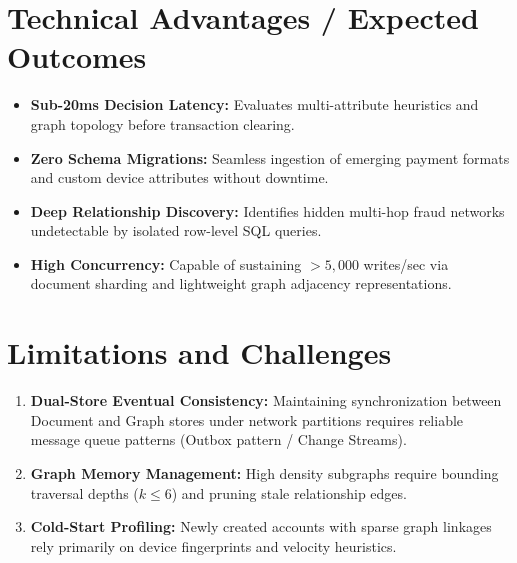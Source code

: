 \documentclass[11pt,a4paper]{article}
\begin{document}
\section{Technical Advantages / Expected Outcomes}
\begin{itemize}[leftmargin=1.5em]
    \item \textbf{Sub-20ms Decision Latency:} Evaluates multi-attribute heuristics and graph topology before transaction clearing.
    \item \textbf{Zero Schema Migrations:} Seamless ingestion of emerging payment formats and custom device attributes without downtime.
    \item \textbf{Deep Relationship Discovery:} Identifies hidden multi-hop fraud networks undetectable by isolated row-level SQL queries.
    \item \textbf{High Concurrency:} Capable of sustaining $>5,000$ writes/sec via document sharding and lightweight graph adjacency representations.
\end{itemize}

\section{Limitations and Challenges}
\begin{enumerate}[leftmargin=1.5em]
    \item \textbf{Dual-Store Eventual Consistency:} Maintaining synchronization between Document and Graph stores under network partitions requires reliable message queue patterns (Outbox pattern / Change Streams).
    \item \textbf{Graph Memory Management:} High density subgraphs require bounding traversal depths ($k \le 6$) and pruning stale relationship edges.
    \item \textbf{Cold-Start Profiling:} Newly created accounts with sparse graph linkages rely primarily on device fingerprints and velocity heuristics.
\end{enumerate}

\end{document}
